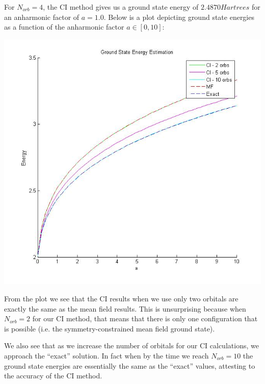 \documentclass{article}
\begin{document}
For $N_{orb} = 4$, the CI method gives us a ground state energy of $2.4870 Hartrees$ for an anharmonic factor of $a = 1.0$. Below is a plot depicting ground state energies as a function of the anharmonic factor $a \in \left[ 0, 10\right]$:
\begin{center}
\includegraphics[scale=0.5]{prob2vi}
\end{center}

From the plot we see that the CI results when we use only two orbitals are exactly the same as the mean field results. This is unsurprising because when $N_{orb}=2$ for our CI method, that means that there is only one configuration that is possible (i.e. the symmetry-constrained mean field ground state).

We also see that as we increase the number of orbitals for our CI calculations, we approach the ``exact'' solution. In fact when by the time we reach $N_{orb}=10$ the ground state energies are essentially the same as the ``exact'' values, attesting to the accuracy of the CI method.
\end{document}
